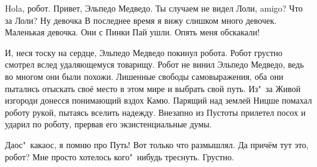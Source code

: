 {\small 
\begin{dialog}
\X Hola, робот.
\R Привет, Эльпедо Медведо.
\X Ты случаем не видел Лоли, amigo?
\R Что за Лоли?
\X Ну девочка\ldotst{}
\R В последнее время я вижу слишком много девочек.
\X Маленькая девочка.
\R Они с Пинки Пай ушли.
\X Опять меня обскакали!
\end{dialog}

\begin{monolog}
И, неся тоску на сердце, Эльпедо Медведо покинул робота. Робот грустно смотрел вслед удаляющемуся товарищу. Робот не винил Эльпедо Медведо, ведь во многом они были похожи. Лишенные свободы самовыражения, оба они пытались отыскать своё место в этом мире и выбрать свой путь. Из"~за Живой изгороди донесся понимающий вздох Камю. Парящий над землей Ницше помахал роботу рукой, пытаясь вселить надежду. Внезапно из Пустоты прилетел посох и ударил по роботу, прервав его экзистенциальные думы.
\end{monolog}

\begin{dialog}
\X Даос"~какаос, я помню про Путь! Вот только что размышлял.
\R Да причём тут это, робот? Мне просто хотелось кого"~нибудь треснуть.
\X Грустно.
\end{dialog}
}